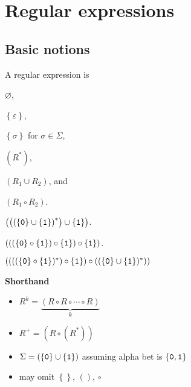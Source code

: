 \documentclass{notes}
\begin{document}
\newpage

\section{Regular expressions}

\subsection{Basic notions}

\begin{defn}
  A regular expression is 
  \begin{olditemize}[topsep = 0ex, itemsep = 0ex]
    \item $\varnothing$, 

    \item $\left \{ \varepsilon \right \}$, 

    \item $\left \{ \sigma \right \}$ for $\sigma \in \Sigma$, 

    \item $(R^*)$, %

    \item $(R_1 \cup R_2)$, and

    \item $(R_1 \circ R_2)$. %
  \end{olditemize}
\end{defn}

\begin{eg}
  $\left ( \left ( \left ( \left \{ \verb~0~ \right \} \cup \left \{ \verb~1~ \right \} \right )^* \right ) \cup \left \{ \verb~1~ \right \} \right )$.
\end{eg}

\begin{eg}
  $\left ( \left ( \left ( \left \{ \verb~0~ \right \} \circ \left \{ \verb~1~ \right \} \right ) \circ \left \{ \verb~1~ \right \} \right ) \circ \left \{ \verb~1~ \right \} \right )$.
\end{eg}

\begin{eg}
  $((((\left \{ \verb~0~ \right \} \circ \left \{ \verb~1~ \right \})^*) \circ \left \{ \verb~1~ \right \}) \circ ((\left \{ \verb~0~ \right \} \cup \left \{ \verb~1~ \right \})^*))$
\end{eg}

{\boldmath \bfseries Shorthand}

\begin{itemize}
  \item $R^k = \underbrace{(R \circ R \circ \cdots \circ R)}_{k}$
    
  \item $R^+ = (R \circ (R^*))$
    
  \item $\Sigma = (\left \{ \verb~0~ \right \} \cup \left \{ \verb~1~ \right \})$ assuming alpha bet is $\left \{ \verb~0~, \verb~1~ \right \}$
    
  \item may omit $\left \{ \right \}$, $()$, $\circ$
\end{itemize}
\end{document}
